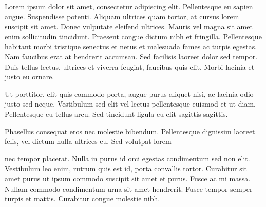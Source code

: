 \documentclass{book}
\begin{document}
\domark Lorem ipsum dolor sit amet, consectetur adipiscing elit. Pellentesque eu sapien augue. Suspendisse potenti. Aliquam ultrices quam tortor, at cursus lorem suscipit sit amet. Donec vulputate eleifend ultrices. Mauris vel magna sit amet enim sollicitudin tincidunt. Praesent congue dictum nibh et fringilla. Pellentesque habitant morbi tristique senectus et netus et malesuada fames ac turpis egestas. Nam faucibus erat at hendrerit accumsan. Sed facilisis laoreet dolor sed tempor. Duis tellus lectus, ultrices et viverra feugiat, faucibus quis elit. Morbi lacinia et justo eu ornare.

\avoidmark Ut porttitor, elit quis commodo porta, augue purus aliquet nisi, ac lacinia odio justo sed neque. Vestibulum sed elit vel lectus pellentesque euismod et ut diam. Pellentesque eu tellus arcu. Sed tincidunt ligula eu elit sagittis sagittis.

\whymark Phasellus consequat eros nec molestie bibendum. Pellentesque dignissim laoreet felis, vel dictum nulla ultrices eu. Sed volutpat lorem 

\notmark nec tempor placerat. Nulla in purus id orci egestas condimentum sed non elit. Vestibulum leo enim, rutrum quis est id, porta convallis tortor. Curabitur sit amet purus ut ipsum commodo suscipit sit amet et purus. Fusce ac mi massa. Nullam commodo condimentum urna sit amet hendrerit. Fusce tempor semper turpis et mattis. Curabitur congue molestie nibh.
\end{document}
